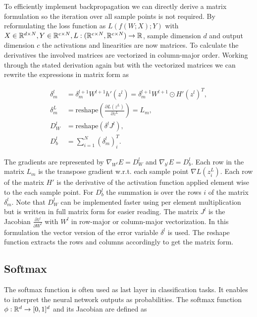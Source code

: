 \documentclass[english,11pt,a4paper]{article}
\begin{document}
To efficiently implement backpropagation we can directly derive a matrix formulation so the iteration over all sample points is not required. By reformulating the loss function as $L(f(W;X);Y)$ with $X \in \mathbb{R}^{d \times N}, Y \in \mathbb{R}^{c \times N}, L: (\mathbb{R}^{c \times N},\mathbb{R}^{c \times N}) \to \mathbb{R}$, sample dimension $d$ and output dimension $c$ the activations and linearities are now matrices. To calculate the derivatives the involved matrices are vectorized in column-major order. Working through the stated derivation again but with the vectorized matrices we can rewrite the expressions in matrix form as

\begin{equation}
	\begin{aligned}
		\delta^l_m &= \delta^{l+1}_m W^{l+1} h'(z^l) = \delta^{l+1}_m W^{l+1} \odot H'(z^l)^T, \\
		\delta^L_m &= \text{reshape}(\frac{\partial L(z^L)}{\partial z^L}) = L_m, \\
		D_W^l &= \text{reshape}(\delta^l J^l), \\
		D_b^l &= \sum_{i=1}^{N} (\delta^l_m)_{i}^T.
	\end{aligned}
\end{equation}

The gradients are represented by $\nabla_{W^l}E = D^l_W$ and $\nabla_{b^l}E = D^l_b$. Each row in the matrix $L_m$ is the transpose gradient w.r.t. each sample point $\nabla L(z^L_i)$. Each row of the matrix $H'$ is the derivative of the activation function applied element wise to the each sample point. For $D^l_b$ the summation is over the rows $i$ of the matrix $\delta^l_m$. Note that $D^l_W$ can be implemented faster using per element multiplication but is written in full matrix form for easier reading. The matrix $J^l$ is the Jacobian $\frac{\partial z^l}{\partial W^l}$ with $W^l$ in row-major or column-major vectorization. In this formulation the vector version of the error variable $\delta^l$ is used. The reshape function extracts the rows and columns accordingly to get the matrix form.

\subsection{Softmax}

The softmax function is often used as last layer in classification tasks. It enables to interpret the neural network outputs as probabilities. The softmax function $\phi: \mathbb{R}^d \to [0,1]^d$ and its Jacobian are defined as
\end{document}
